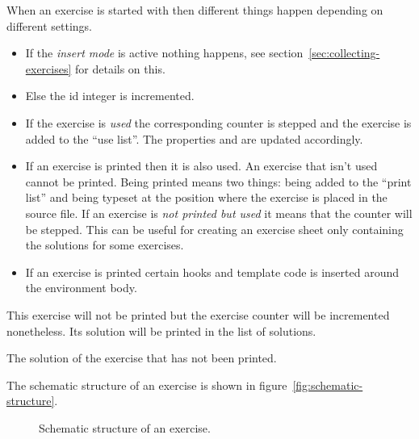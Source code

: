\documentclass[load-preamble+]{cnltx-doc}
\newcommand\environ[1]{\beginenv\Marg{\env{exercise}}}
\begin{document}
When an exercise is started with \environ{exercise} then different things
happen depending on different settings.
\begin{itemize}
  \item If the \emph{insert mode} is active nothing happens, see
    section~\vref{sec:collecting-exercises} for details on this.
  \item Else the id integer is incremented.
  \item If the exercise is \emph{used} the corresponding counter is stepped
    and the exercise is added to the \enquote{use list}.  The properties
     and  are updated accordingly.
  \item If an exercise is printed then it is also used. An exercise that isn't
    used cannot be printed.  Being printed means two things: being added to
    the \enquote{print list} and being typeset at the position where the
    exercise is placed in the source file.  If an exercise is \emph{not
      printed but used} it means that the counter will be stepped.  This can
    be useful for creating an exercise sheet only containing the solutions for
    some exercises.
  \item If an exercise is printed certain hooks and template code is inserted
    around the environment body.
\end{itemize}

\begin{example}[outside]
  \begin{exercise}[print=false]
    This exercise will not be printed but the exercise counter will be
    incremented nonetheless. Its solution will be printed in the list of
    solutions.
  \end{exercise}
  \begin{solution}
    The solution of the exercise that has not been printed.
  \end{solution}
\end{example}

The schematic structure of an exercise is shown in
figure~\vref{fig:schematic-structure}.

\begin{figure}[bhp]
  \centering
  \caption{Schematic structure of an exercise.}\label{fig:schematic-structure} 
\end{figure}
\end{document}
